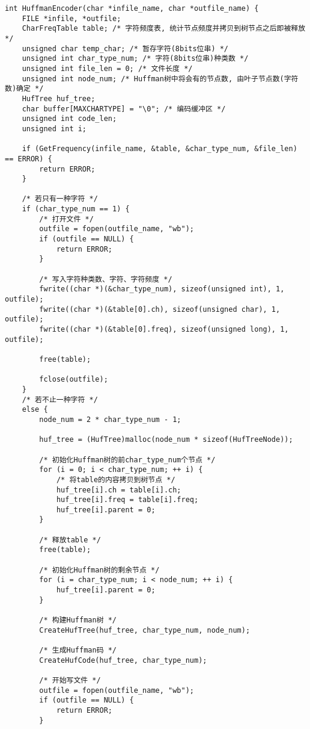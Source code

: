 \documentclass[a4paper]{ctexart}
\begin{document}
{\setmainfont{Courier New Bold}              
\begin{lstlisting}
int HuffmanEncoder(char *infile_name, char *outfile_name) {
    FILE *infile, *outfile;
    CharFreqTable table; /* 字符频度表, 统计节点频度并拷贝到树节点之后即被释放 */
    unsigned char temp_char; /* 暂存字符(8bits位串) */
    unsigned int char_type_num; /* 字符(8bits位串)种类数 */
    unsigned int file_len = 0; /* 文件长度 */
    unsigned int node_num; /* Huffman树中将会有的节点数, 由叶子节点数(字符数)确定 */
    HufTree huf_tree;
    char buffer[MAXCHARTYPE] = "\0"; /* 编码缓冲区 */
    unsigned int code_len;
    unsigned int i;

    if (GetFrequency(infile_name, &table, &char_type_num, &file_len) == ERROR) {
        return ERROR;
    }

    /* 若只有一种字符 */
    if (char_type_num == 1) {
        /* 打开文件 */
        outfile = fopen(outfile_name, "wb");
        if (outfile == NULL) {
            return ERROR;
        }

        /* 写入字符种类数、字符、字符频度 */
        fwrite((char *)(&char_type_num), sizeof(unsigned int), 1, outfile);
        fwrite((char *)(&table[0].ch), sizeof(unsigned char), 1, outfile);
        fwrite((char *)(&table[0].freq), sizeof(unsigned long), 1, outfile);

        free(table);

        fclose(outfile);
    }
    /* 若不止一种字符 */
    else {
        node_num = 2 * char_type_num - 1;

        huf_tree = (HufTree)malloc(node_num * sizeof(HufTreeNode));

        /* 初始化Huffman树的前char_type_num个节点 */
        for (i = 0; i < char_type_num; ++ i) {
            /* 将table的内容拷贝到树节点 */
            huf_tree[i].ch = table[i].ch;
            huf_tree[i].freq = table[i].freq;
            huf_tree[i].parent = 0;
        }

        /* 释放table */
        free(table);

        /* 初始化Huffman树的剩余节点 */
        for (i = char_type_num; i < node_num; ++ i) {
            huf_tree[i].parent = 0;
        }

        /* 构建Huffman树 */
        CreateHufTree(huf_tree, char_type_num, node_num);

        /* 生成Huffman码 */
        CreateHufCode(huf_tree, char_type_num);

        /* 开始写文件 */
        outfile = fopen(outfile_name, "wb");
        if (outfile == NULL) {
            return ERROR;
        }


\end{lstlisting}}
\end{document}
